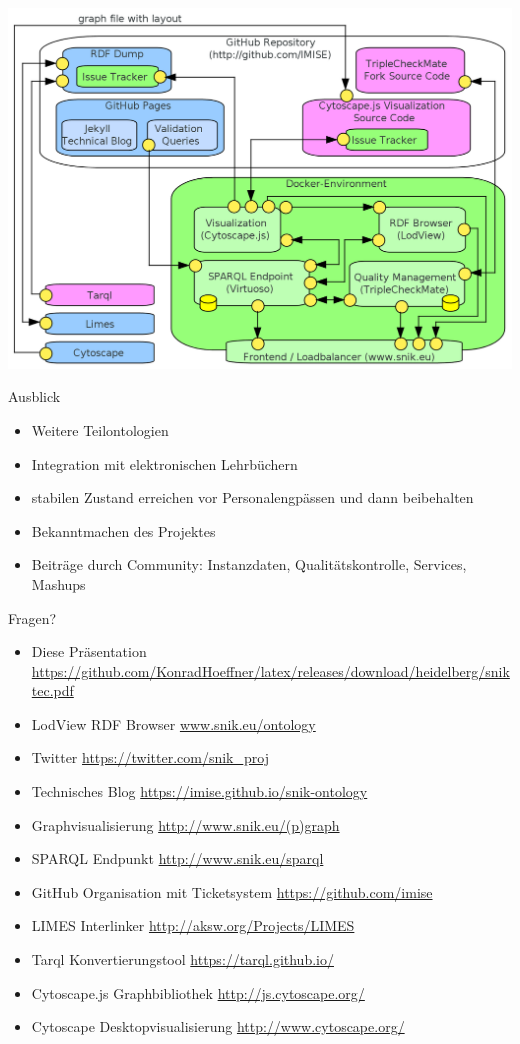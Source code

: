 \documentclass{beamer}
\begin{document}
\begin{frame}
\includegraphics[width=\textwidth]{img/architecture.png}
\end{frame}

\begin{frame}{Ausblick}
\begin{itemize}
\item Weitere Teilontologien 
\item Integration mit elektronischen Lehrbüchern
\item stabilen Zustand erreichen vor Personalengpässen und dann beibehalten
\item Bekanntmachen des Projektes
\item Beiträge durch Community: Instanzdaten, Qualitätskontrolle, Services, Mashups 
\end{itemize}
\end{frame}

\begin{frame}[fragile]{Fragen?}
\begin{itemize}
\item Diese Präsentation \url{https://github.com/KonradHoeffner/latex/releases/download/heidelberg/sniktec.pdf}
\item LodView RDF Browser \url{www.snik.eu/ontology}
\item Twitter \url{https://twitter.com/snik\_proj}
\item Technisches Blog \url{https://imise.github.io/snik-ontology}
\item Graphvisualisierung \url{http://www.snik.eu/(p)graph}
\item SPARQL Endpunkt \url{http://www.snik.eu/sparql}
\item GitHub Organisation mit Ticketsystem \url{https://github.com/imise}
\item LIMES Interlinker \url{http://aksw.org/Projects/LIMES}
\item Tarql Konvertierungstool \url{https://tarql.github.io/}
\item Cytoscape.js Graphbibliothek \url{http://js.cytoscape.org/}
\item Cytoscape Desktopvisualisierung \url{http://www.cytoscape.org/}
\end{itemize}
\end{frame}
 
\end{document}
